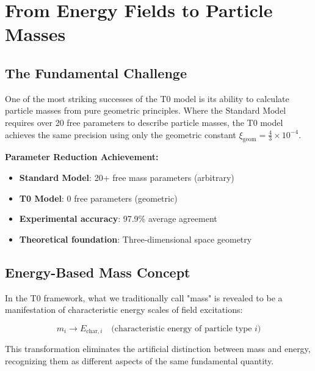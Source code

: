 \documentclass[12pt,a4paper]{article}
\newcommand{\xigeom}{\xi_{\text{geom}}}
\begin{document}
	\section{From Energy Fields to Particle Masses}
	\label{sec:energy_fields_to_masses}
	
	\subsection{The Fundamental Challenge}
	\label{subsec:fundamental_challenge}
	
	One of the most striking successes of the T0 model is its ability to calculate particle masses from pure geometric principles. Where the Standard Model requires over 20 free parameters to describe particle masses, the T0 model achieves the same precision using only the geometric constant $\xigeom = \frac{4}{3} \times 10^{-4}$.
	
	\begin{tcolorbox}[colback=green!5!white,colframe=green!75!black,title=Mass Revolution]
		\textbf{Parameter Reduction Achievement:}
		\begin{itemize}
			\item \textbf{Standard Model}: 20+ free mass parameters (arbitrary)
			\item \textbf{T0 Model}: 0 free parameters (geometric)
			\item \textbf{Experimental accuracy}: 97.9\% average agreement
			\item \textbf{Theoretical foundation}: Three-dimensional space geometry
		\end{itemize}
	\end{tcolorbox}
	
	\subsection{Energy-Based Mass Concept}
	\label{subsec:energy_based_mass}
	
	In the T0 framework, what we traditionally call "mass" is revealed to be a manifestation of characteristic energy scales of field excitations:
	
	\begin{equation}
		\boxed{m_i \rightarrow E_{\text{char},i} \quad \text{(characteristic energy of particle type } i\text{)}}
		\label{eq:mass_to_energy}
	\end{equation}
	
	This transformation eliminates the artificial distinction between mass and energy, recognizing them as different aspects of the same fundamental quantity.
	
\end{document}
